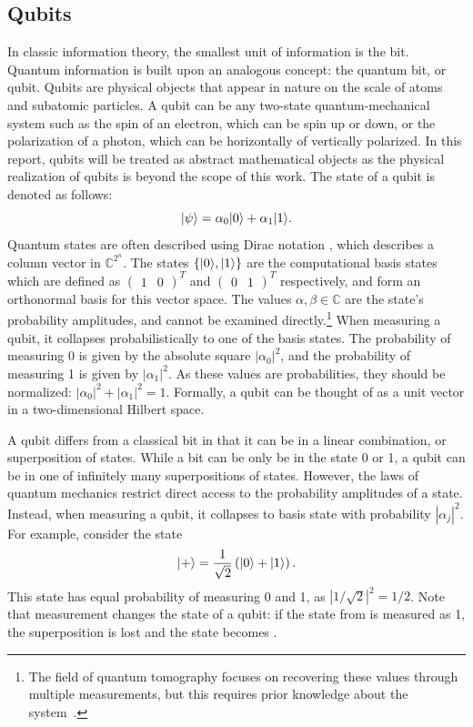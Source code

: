 \subsection{Qubits} \label{sec:quantum-states}
In classic information theory, the smallest unit of information is the bit.
Quantum information is built upon an analogous concept: the quantum bit, or qubit.
Qubits are physical objects that appear in nature on the scale of atoms and subatomic particles.
A qubit can be any two-state quantum-mechanical system such as the spin of an electron, which can be spin up or down, or the polarization of a photon, which can be horizontally of vertically polarized.
In this report, qubits will be treated as abstract mathematical objects as the physical realization of qubits is beyond the scope of this work.
The state of a qubit is denoted as follows:
\begin{equation} \label{eqn:qubit-state}
\vert{\psi}\rangle = \alpha_0\vert{0}\rangle + \alpha_1\vert{1}\rangle.
\end{equation}
Quantum states are often described using Dirac notation \ket{\,\cdotp\,}, which describes a column vector in $\mathbb{C}^{2^n}$.
The states $\{\vert{0}\rangle, \vert{1}\rangle\}$ are the computational basis states which are defined as $(\begin{matrix}1 & 0\end{matrix})^T$ and $(\begin{matrix}0 & 1\end{matrix})^T$ respectively, and form an orthonormal basis for this vector space.
The values $\alpha, \beta \in \mathbb{C}$ are the state's probability amplitudes, and cannot be examined directly.\footnote{The field of quantum tomography focuses on recovering these values through multiple measurements, but this requires prior knowledge about the system~\cite{d2003quantum}.}
When measuring a qubit, it collapses probabilistically to one of the basis states.
The probability of measuring 0 is given by the absolute square $|\alpha_0|^2$, and the probability of measuring 1 is given by $|\alpha_1|^2$.
As these values are probabilities, they should be normalized: $|\alpha_0|^2 + |\alpha_1|^2 = 1$.
Formally, a qubit can be thought of as a unit vector in a two-dimensional Hilbert space.

A qubit differs from a classical bit in that it can be in a linear combination, or superposition of states.
While a bit can be only be in the state 0 or 1, a qubit can be in one of infinitely many superpositions of states.
However, the laws of quantum mechanics restrict direct access to the probability amplitudes of a state.
Instead, when measuring a qubit, it collapses to basis state  with probability $|\alpha_j|^2$.
For example, consider the state
\begin{equation} \label{eqn:plus-state}
\vert{+}\rangle = \dfrac{1}{\sqrt{2}}\left(\vert{0}\rangle + \vert{1}\rangle\right).
\end{equation}
This state has equal probability of measuring 0 and 1, as $|1/\sqrt{2}|^2 = 1/2$.
Note that measurement changes the state of a qubit: if the state from  is measured as 1, the superposition is lost and the state becomes .

